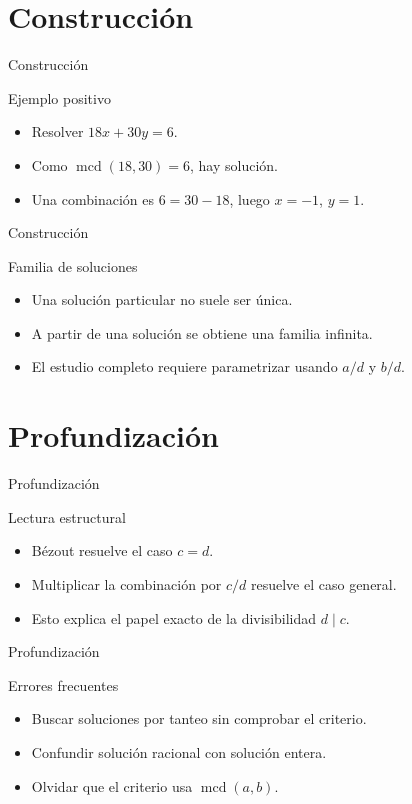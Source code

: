 \documentclass[aspectratio=169,11pt]{beamer}
\newcommand{\mcd}{\operatorname{mcd}}
\begin{document}
\section{Construcción}

\begin{frame}{Construcción}
\begin{block}{Ejemplo positivo}
\begin{itemize}
  \item Resolver \(18x+30y=6\).
  \item Como \(\mcd(18,30)=6\), hay solución.
  \item Una combinación es \(6=30-18\), luego \(x=-1\), \(y=1\).
\end{itemize}
\end{block}
\end{frame}

\begin{frame}{Construcción}
\begin{block}{Familia de soluciones}
\begin{itemize}
  \item Una solución particular no suele ser única.
  \item A partir de una solución se obtiene una familia infinita.
  \item El estudio completo requiere parametrizar usando \(a/d\) y \(b/d\).
\end{itemize}
\end{block}
\end{frame}

\section{Profundización}

\begin{frame}{Profundización}
\begin{block}{Lectura estructural}
\begin{itemize}
  \item Bézout resuelve el caso \(c=d\).
  \item Multiplicar la combinación por \(c/d\) resuelve el caso general.
  \item Esto explica el papel exacto de la divisibilidad \(d\mid c\).
\end{itemize}
\end{block}
\end{frame}

\begin{frame}{Profundización}
\begin{block}{Errores frecuentes}
\begin{itemize}
  \item Buscar soluciones por tanteo sin comprobar el criterio.
  \item Confundir solución racional con solución entera.
  \item Olvidar que el criterio usa \(\mcd(a,b)\).
\end{itemize}
\end{block}
\end{frame}
\end{document}
